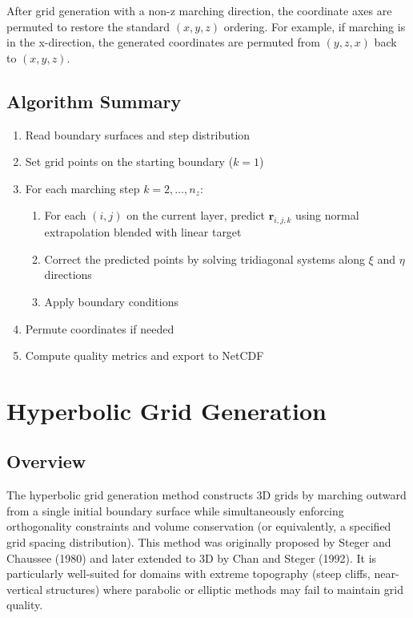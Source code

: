 \documentclass[11pt,a4paper]{report}
\newcommand{\rvec}{\bm{r}}
\begin{document}
After grid generation with a non-z marching direction, the coordinate axes are permuted to restore the standard $(x, y, z)$ ordering. For example, if marching is in the x-direction, the generated coordinates are permuted from $(y, z, x)$ back to $(x, y, z)$.

\section{Algorithm Summary}

\begin{enumerate}
    \item Read boundary surfaces and step distribution
    \item Set grid points on the starting boundary ($k=1$)
    \item For each marching step $k = 2, \dots, n_z$:
    \begin{enumerate}
        \item For each $(i,j)$ on the current layer, predict $\rvec_{i,j,k}$ using normal extrapolation blended with linear target
        \item Correct the predicted points by solving tridiagonal systems along $\xi$ and $\eta$ directions
        \item Apply boundary conditions
    \end{enumerate}
    \item Permute coordinates if needed
    \item Compute quality metrics and export to NetCDF
\end{enumerate}

\chapter{Hyperbolic Grid Generation}

\section{Overview}

The hyperbolic grid generation method constructs 3D grids by marching outward from a single initial boundary surface while simultaneously enforcing orthogonality constraints and volume conservation (or equivalently, a specified grid spacing distribution). This method was originally proposed by Steger and Chaussee (1980) and later extended to 3D by Chan and Steger (1992). It is particularly well-suited for domains with extreme topography (steep cliffs, near-vertical structures) where parabolic or elliptic methods may fail to maintain grid quality.
\end{document}
